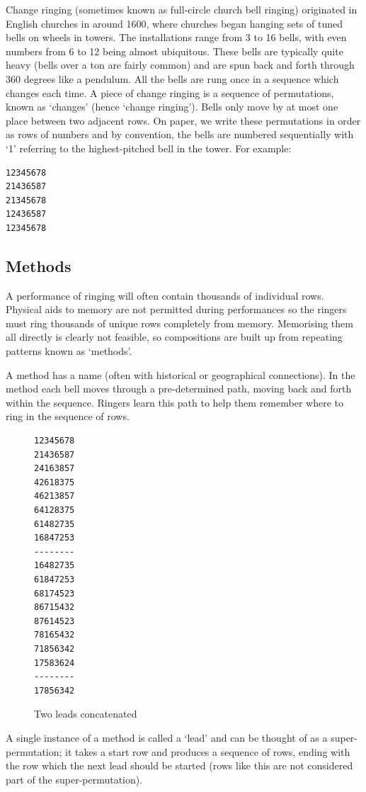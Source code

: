 \documentclass[12pt]{article}
\newcommand{\br}[0]{\vspace{10pt} \noindent}
\begin{document}
\br{}Change ringing (sometimes known as full-circle church bell ringing) originated in English
churches in around 1600, where churches began hanging sets of tuned bells on wheels in towers.
The installations range from 3 to 16 bells, with even numbers from 6 to 12 being almost ubiquitous.
These bells are typically quite heavy (bells over a ton are fairly common) and are spun
back and forth through 360 degrees like a pendulum.  All the bells are rung once in a sequence which
changes each time.  A piece of change ringing is a sequence of permutations, known as `changes'
(hence `change ringing').  Bells only move by at most one place between two adjacent rows.  On
paper, we write these permutations in order as rows of numbers and by convention, the bells
are numbered sequentially with `1' referring to the highest-pitched bell in the tower.  For
example:

\begin{verbatim}
12345678
21436587
21345678
12436587
12345678
\end{verbatim}

\subsection{Methods}
A performance of ringing will often contain thousands of individual rows.  Physical aids to memory
are not permitted during performances so the ringers must ring thousands of unique rows completely
from memory.  Memorising them all directly is clearly not feasible, so compositions are built up
from repeating patterns known as `methods'.

A method has a name (often with historical or geographical connections). In the method each bell
moves through a pre-determined path, moving back and forth within the sequence. Ringers learn this
path to help them remember where to ring in the sequence of rows.

\begin{figure}
\centering
\begin{BVerbatim}
12345678
21436587
24163857
42618375
46213857
64128375
61482735
16847253
--------
16482735
61847253
68174523
86715432
87614523
78165432
71856342
17583624
--------
17856342
\end{BVerbatim}
\caption{Two leads concatenated}\label{fig:two-leads-lb8}
\end{figure}

A single instance of a method is called a `lead' and can be thought of as a super-permutation; it
takes a start row and produces a sequence of rows, ending with the row which the next lead should be
started (rows like this are not considered part of the super-permutation).
\end{document}

